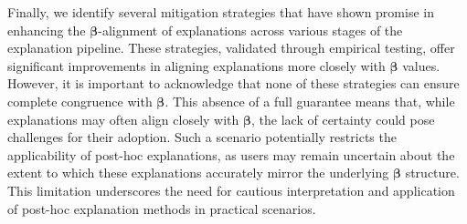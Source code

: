 \documentclass[mnsc,blindrev]{informs3}
\begin{document}
        
        Finally,  we identify several mitigation strategies that have shown promise in enhancing the $\boldsymbol{\beta}$-alignment of explanations across various stages of the explanation pipeline. These strategies, validated through empirical testing, offer significant improvements in aligning explanations more closely with $\boldsymbol{\beta}$ values. However, it is important to acknowledge that none of these strategies can ensure complete congruence with $\boldsymbol{\beta}$. This absence of a full guarantee means that, while explanations may often align closely with $\boldsymbol{\beta}$, the lack of certainty could pose challenges for their adoption. Such a scenario potentially restricts the applicability of post-hoc explanations, as users may remain uncertain about the extent to which these explanations accurately mirror the underlying $\boldsymbol{\beta}$ structure. This limitation underscores the need for cautious interpretation and application of post-hoc explanation methods in practical scenarios.
        
        

            



        
\end{document}
